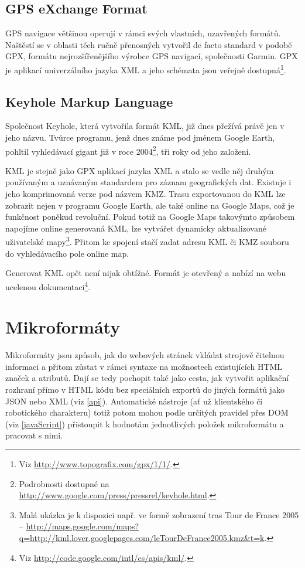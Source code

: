\subsection{GPS eXchange Format}
GPS navigace většinou operují v rámci svých vlastních, uzavřených
formátů. Naštěstí se v oblasti těch ručně přenosných vytvořil de
facto standard v podobě GPX, formátu nej\-rozšířenějšího výrobce GPS
navigací, společnosti Garmin. GPX je aplikací univerzálního jazyka
XML a jeho schémata jsou veřejně dostupná\footnote{Viz
\url{http://www.topografix.com/gpx/1/1/}.}.

\subsection{Keyhole Markup Language}
Společnost Keyhole, která vytvořila formát KML, již dnes přežívá
právě jen v jeho názvu. Tvůrce programu, jenž dnes známe pod jménem
Google Earth, pohltil vyhledávací gigant již v roce
2004\footnote{Podrobnosti dostupné na
\url{http://www.google.com/press/pressrel/keyhole.html}.}, tři roky od
jeho založení.

KML je stejně jako GPX aplikací jazyka XML a stalo se vedle něj
druhým používaným a uznávaným standardem pro záznam geografických
dat. Existuje i jeho komprimovaná verze pod názvem KMZ. Trasu
exportovanou do KML lze zobrazit nejen v programu Google Earth, ale
také online na Google Maps, což je funkčnost poněkud revoluční. Pokud
totiž na Google Maps takovýmto způsobem napojíme online generovaná
KML, lze vytvářet dy\-na\-mic\-ky aktualizované uživatelské
mapy\footnote{Malá ukázka je k dispozici např. ve formě zobrazení tras Tour de France
2005 --
\url{http://maps.google.com/maps?q=http://kml.lover.googlepages.com/leTourDeFrance2005.kmz&t=k}.}.
Přitom ke spojení stačí zadat adresu KML či KMZ souboru do vyhledávacího pole online map.

Generovat KML opět není nijak obtížné. Formát je otevřený a nabízí na
webu ucelenou dokumentaci\footnote{Viz
\url{http://code.google.com/intl/cs/apis/kml/}.}.

\section{Mikroformáty}
Mikroformáty jsou způsob, jak do webových stránek vkládat strojově
čitelnou informaci a přitom zůstat v rámci syntaxe na možnostech
existujících HTML značek a atributů. Dají se tedy pochopit také jako
cesta, jak vytvořit aplikační rozhraní přímo v HTML kódu bez
speciálních exportů do jiných formátů jako JSON nebo XML (viz
\ref{api}). Automatické nástroje (ať už klientského či robotického
charakteru) totiž potom mohou podle určitých pravidel přes DOM (viz
\ref{javaScript}) přistoupit k hodnotám jednotlivých položek
mikroformátu a pracovat s nimi.

